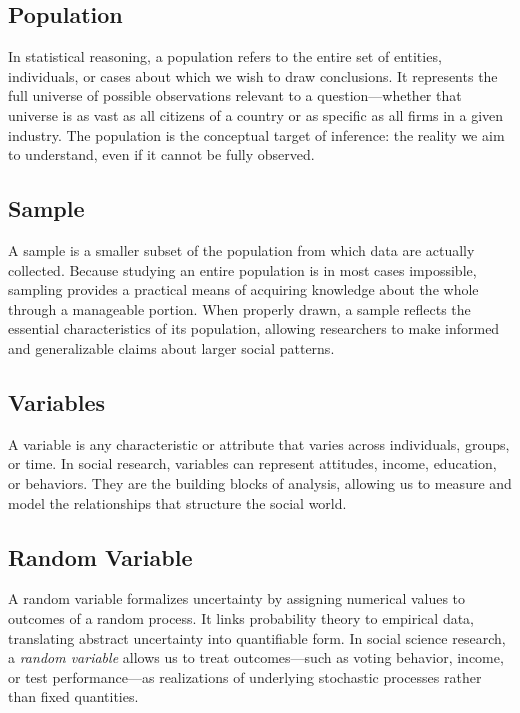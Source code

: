 \documentclass[
  letterpaper,
  DIV=11,
  numbers=noendperiod]{scrreprt}
\begin{document}
\subsection{Population}\label{population}

In statistical reasoning, a population refers to the entire set of
entities, individuals, or cases about which we wish to draw conclusions.
It represents the full universe of possible observations relevant to a
question---whether that universe is as vast as all citizens of a country
or as specific as all firms in a given industry. The population is the
conceptual target of inference: the reality we aim to understand, even
if it cannot be fully observed.

\subsection{Sample}\label{sample}

A sample is a smaller subset of the population from which data are
actually collected. Because studying an entire population is in most
cases impossible, sampling provides a practical means of acquiring
knowledge about the whole through a manageable portion. When properly
drawn, a sample reflects the essential characteristics of its
population, allowing researchers to make informed and generalizable
claims about larger social patterns.

\subsection{Variables}\label{variables}

A variable is any characteristic or attribute that varies across
individuals, groups, or time. In social research, variables can
represent attitudes, income, education, or behaviors. They are the
building blocks of analysis, allowing us to measure and model the
relationships that structure the social world.

\subsection{Random Variable}\label{random-variable}

A random variable formalizes uncertainty by assigning numerical values
to outcomes of a random process. It links probability theory to
empirical data, translating abstract uncertainty into quantifiable form.
In social science research, a \emph{random variable} allows us to treat
outcomes---such as voting behavior, income, or test performance---as
realizations of underlying stochastic processes rather than fixed
quantities.
\end{document}
